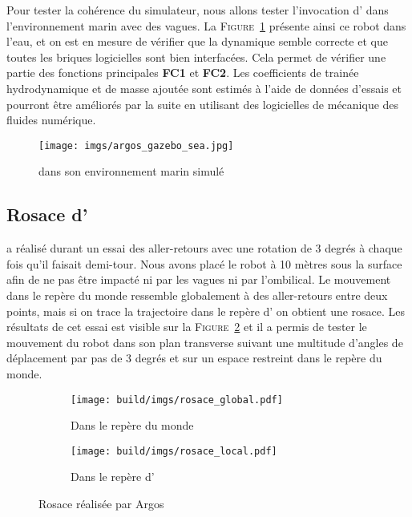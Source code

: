 			Pour tester la cohérence du simulateur, nous allons tester l'invocation d'\argos{} dans l'environnement marin avec des vagues. La \textsc{Figure}~\ref{fig:argos_sea} présente ainsi ce robot dans l'eau, et on est en mesure de vérifier que la dynamique semble correcte et que toutes les briques logicielles sont bien interfacées. Cela permet de vérifier une partie des fonctions principales \textbf{FC1} et \textbf{FC2}. Les coefficients de trainée hydrodynamique et de masse ajoutée sont estimés à l'aide de données d'essais et pourront être améliorés par la suite en utilisant des logicielles de mécanique des fluides numérique.

			\begin{figure}
				\centering
				\texttt{[image: imgs/argos\_gazebo\_sea.jpg]}
				\caption{\argos{} dans son environnement marin simulé}
				\label{fig:argos_sea}
			\end{figure}

		\subsection{Rosace d'\argos{}}

			\argos{} a réalisé durant un essai des aller-retours avec une rotation de 3 degrés à chaque fois qu'il faisait demi-tour. Nous avons placé le robot à 10 mètres sous la surface afin de ne pas être impacté ni par les vagues ni par l'ombilical. Le mouvement dans le repère du monde ressemble globalement à des aller-retours entre deux points, mais si on trace la trajectoire dans le repère d'\argos{} on obtient une rosace. Les résultats de cet essai est visible sur la \textsc{Figure}~\ref{fig:rosace_argos} et il a permis de tester le mouvement du robot dans son plan transverse suivant une multitude d'angles de déplacement par pas de 3 degrés et sur un espace restreint dans le repère du monde.

			\begin{figure}[!htb]
				\centering
				\begin{subfigure}[t]{0.48\textwidth}
					\centering
					\texttt{[image: build/imgs/rosace\_global.pdf]}
					\caption{Dans le repère du monde}
				\end{subfigure}
				\hfill
				\begin{subfigure}[t]{0.48\textwidth}
					\centering
					\texttt{[image: build/imgs/rosace\_local.pdf]}
					\caption{Dans le repère d'\argos{}}
				\end{subfigure}
				\caption{Rosace réalisée par Argos}
				\label{fig:rosace_argos}
			\end{figure}


